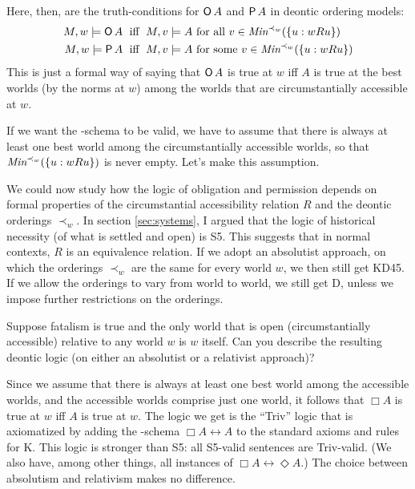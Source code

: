 Here, then, are the truth-conditions for $\operatorname{\mathsf{O}} A$ and $\operatorname{\mathsf{P}} A$ in deontic ordering
models:
\begin{align*}
  M,w \models \operatorname{\mathsf{O}} A &\text{ \;iff\; $M,v \models A$ for all $v \in \emph{Min}^{\prec_w}(\{ u: wRu\})$}\\
  M,w \models \operatorname{\mathsf{P}} A &\text{ \;iff\; $M,v \models A$ for some $v \in \emph{Min}^{\prec_w}(\{ u: wRu\})$}
\end{align*}
This is just a formal way of saying that $\operatorname{\mathsf{O}} A$ is true at $w$ iff $A$ is true
at the best worlds (by the norms at $w$) among the worlds that are circumstantially accessible at $w$.

If we want the -schema to be valid, we have to assume that there is always
at least one best world among the circumstantially accessible worlds, so that
$\emph{Min}^{\prec_w}(\{ u: wRu\})$ is never empty. Let's make this assumption.

We could now study how the logic of obligation and permission depends on formal
properties of the circumstantial accessibility relation $R$ and the deontic
orderings $\prec_w$. In section \ref{sec:systems}, I argued that the logic of
historical necessity (of what is settled and open) is S5. This suggests that in
normal contexts, $R$ is an equivalence relation. If we adopt an absolutist
approach, on which the orderings $\prec_{w}$ are the same for every world $w$, we
then still get KD45. If we allow the orderings to vary from world to world, we
still get D, unless we impose further restrictions on the orderings.


\begin{exercise}
  Suppose fatalism is true and the only world that is open (circumstantially
  accessible) relative to any world $w$ is $w$ itself. Can you describe the
  resulting deontic logic (on either an absolutist or a relativist approach)?
\end{exercise}
\begin{solution}
  Since we assume that there is always at least one best world among the
  accessible worlds, and the accessible worlds comprise just one world, it
  follows that $\Box A$ is true at $w$ iff $A$ is true at $w$. The logic we get
  is the ``Triv'' logic that is axiomatized by adding the -schema
  $\Box A \leftrightarrow A$ to the standard axioms and rules for K. This logic
  is stronger than S5: all S5-valid sentences are Triv-valid. (We also have,
  among other things, all instances of $\Box A \leftrightarrow \Diamond A$.) The
  choice between absolutism and relativism makes no difference.
\end{solution}


